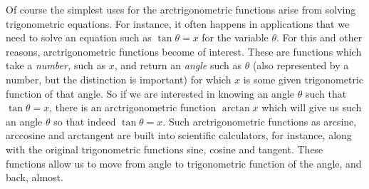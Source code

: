 Of course the simplest uses for 
the arctrigonometric functions
arise from solving trigonometric equations.
For instance, it often happens in applications that we need to solve an
equation such as $\tan\theta=x$ for the variable $\theta$.
For this and other reasons, arctrigonometric functions become of interest.
These are functions which take a {\it number,} such as $x$, and return 
an {\it angle} such as $\theta$ (also represented by a number, but
the distinction is important)
for which $x$ is some given trigonometric function of that
angle.  So if we are interested in knowing an angle
$\theta$ such that $\tan\theta=x$,  there
is an arctrigonometric function $\arctan x$ which will give us
such an angle $\theta$ so that indeed $\tan\theta=x$.  Such arctrigonometric
functions as arcsine, arccosine and arctangent
are built into scientific calculators, for instance,
along with the original trigonometric functions sine, cosine and tangent.
These functions allow us to move from 
angle to trigonometric function of the angle, and back, almost.

